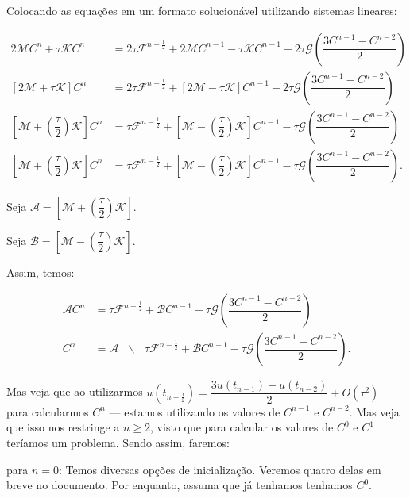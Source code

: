   Colocando as equações em um formato solucionável utilizando sistemas lineares:

  \begin{align*}
    2\mathcal{M}C^n + \tau\mathcal{K}C^n &= 2\tau \mathcal{F}^{n - \frac{1}{2}} + 2\mathcal{M}C^{n-1} - \tau\mathcal{K}C^{n-1} - 2\tau\mathcal{G}\left(\dfrac{3C^{n-1} - C^{n-2}}{2}\right)\\
    \left[2\mathcal{M} + \tau\mathcal{K}\right]C^n &= 2\tau \mathcal{F}^{n - \frac{1}{2}} + \left[2\mathcal{M} - \tau\mathcal{K}\right]C^{n-1} - 2\tau\mathcal{G}\left(\dfrac{3C^{n-1} - C^{n-2}}{2}\right)\\
    \left[\mathcal{M} + \left(\dfrac{\tau}{2}\right)\mathcal{K}\right]C^n &= \tau \mathcal{F}^{n - \frac{1}{2}} + \left[\mathcal{M} - \left(\dfrac{\tau}{2}\right)\mathcal{K}\right]C^{n-1} - \tau\mathcal{G}\left(\dfrac{3C^{n-1} - C^{n-2}}{2}\right)\\
    \left[\mathcal{M} + \left(\dfrac{\tau}{2}\right)\mathcal{K}\right]C^n &= \tau \mathcal{F}^{n - \frac{1}{2}} + \left[\mathcal{M} - \left(\dfrac{\tau}{2}\right)\mathcal{K}\right]C^{n-1} - \tau\mathcal{G}\left(\dfrac{3C^{n-1} - C^{n-2}}{2}\right).
  \end{align*}

  Seja $\displaystyle \mathcal{A} = \left[\mathcal{M} + \left(\dfrac{\tau}{2}\right)\mathcal{K}\right]$.

  Seja $\displaystyle \mathcal{B} = \left[\mathcal{M} - \left(\dfrac{\tau}{2}\right)\mathcal{K}\right]$.

  Assim, temos:

  \begin{align*}
    \mathcal{A} C^n &= \tau \mathcal{F}^{n - \frac{1}{2}} + \mathcal{B} C^{n-1} - \tau\mathcal{G}\left(\dfrac{3C^{n-1} - C^{n-2}}{2}\right) \\
    C^n &= \mathcal{A}\text{ }\backslash \text{ }\tau \mathcal{F}^{n - \frac{1}{2}} + \mathcal{B}C^{n-1} - \tau\mathcal{G}\left(\dfrac{3C^{n-1} - C^{n-2}}{2}\right).
  \end{align*}

  Mas veja que ao utilizarmos $u(t_{n - \frac{1}{2}}) = \dfrac{3u(t_{n-1}) - u(t_{n-2})}{2} + O(\tau^2)$ --- para calcularmos $C^n$ --- estamos utilizando os valores de $C^{n-1}$ e $C^{n-2}$. Mas veja que isso nos restringe a $n \geq 2$, visto que para calcular os valores de $C^0$ e $C^1$ teríamos um problema. Sendo assim, faremos:

  para $n = 0$: Temos diversas opções de inicialização. Veremos quatro delas em breve no documento. Por enquanto, assuma que já tenhamos tenhamos $C^0$.

